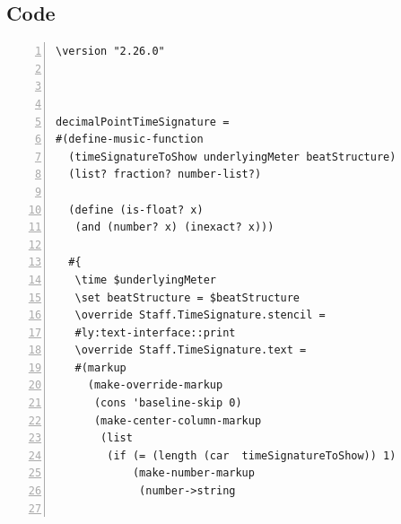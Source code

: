 \subsection{Code}
\begin{Verbatim}[numbers=left,xleftmargin=5mm]
\version "2.26.0"



decimalPointTimeSignature =
#(define-music-function
  (timeSignatureToShow underlyingMeter beatStructure)
  (list? fraction? number-list?)

  (define (is-float? x)
   (and (number? x) (inexact? x)))

  #{
   \time $underlyingMeter
   \set beatStructure = $beatStructure
   \override Staff.TimeSignature.stencil =
   #ly:text-interface::print
   \override Staff.TimeSignature.text =
   #(markup
     (make-override-markup
      (cons 'baseline-skip 0)
      (make-center-column-markup
       (list
        (if (= (length (car  timeSignatureToShow)) 1)
            (make-number-markup
             (number->string


\end{Verbatim}
